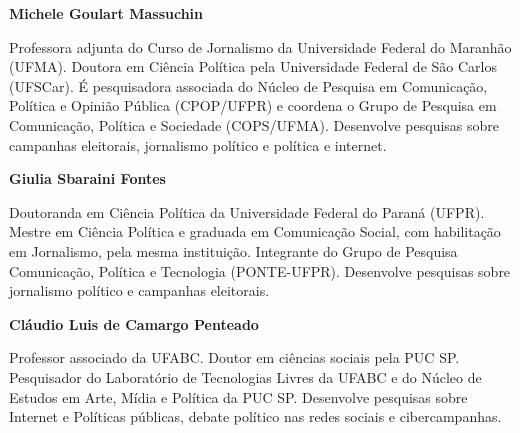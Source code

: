\textbf{Michele Goulart Massuchin}

Professora adjunta do Curso de Jornalismo da Universidade Federal do
Maranhão (UFMA). Doutora em Ciência Política pela Universidade Federal
de São Carlos (UFSCar). É pesquisadora associada do Núcleo de Pesquisa
em Comunicação, Política e Opinião Pública (CPOP/UFPR) e coordena o
Grupo de Pesquisa em Comunicação, Política e Sociedade (COPS/UFMA).
Desenvolve pesquisas sobre campanhas eleitorais, jornalismo político e
política e internet.

\textbf{Giulia Sbaraini Fontes}

Doutoranda em Ciência Política da Universidade Federal do Paraná (UFPR).
Mestre em Ciência Política e graduada em Comunicação Social, com
habilitação em Jornalismo, pela mesma instituição. Integrante do Grupo
de Pesquisa Comunicação, Política e Tecnologia (PONTE-UFPR). Desenvolve
pesquisas sobre jornalismo político e campanhas eleitorais.

\textbf{Cláudio Luis de Camargo Penteado}

Professor associado da UFABC. Doutor em ciências sociais pela PUC SP.
Pesquisador do Laboratório de Tecnologias Livres da UFABC e do Núcleo de
Estudos em Arte, Mídia e Política da PUC SP. Desenvolve pesquisas sobre
Internet e Políticas públicas, debate político nas redes sociais e
cibercampanhas.
